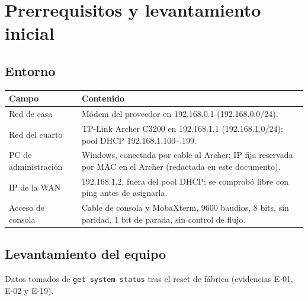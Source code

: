 \documentclass[11pt,a4paper]{article}
\begin{document}
\section{Prerrequisitos y levantamiento inicial}

\subsection{Entorno}

{\small\noindent
\begin{tabularx}{\linewidth}{@{}P{4.2cm}Y@{}}
\toprule
{}\textbf{Campo} & \textbf{Contenido}\\\midrule
Red de casa & Módem del proveedor en 192.168.0.1 (192.168.0.0/24). \\
Red del cuarto & TP-Link Archer C3200 en 192.168.1.1 (192.168.1.0/24); pool DHCP 192.168.1.100--.199. \\
PC de administración & Windows, conectada por cable al Archer; IP fija reservada por MAC en el Archer (redactada en este documento). \\
IP de la WAN & 192.168.1.2, fuera del pool DHCP; se comprobó libre con ping antes de asignarla. \\
Acceso de consola & Cable de consola y MobaXterm, 9600 baudios, 8 bits, sin paridad, 1 bit de parada, sin control de flujo. \\
\bottomrule
\end{tabularx}\par}

\newpage
\subsection{Levantamiento del equipo}

Datos tomados de \texttt{get system status} tras el reset de fábrica (evidencias E-01, E-02 y E-19).
\end{document}
